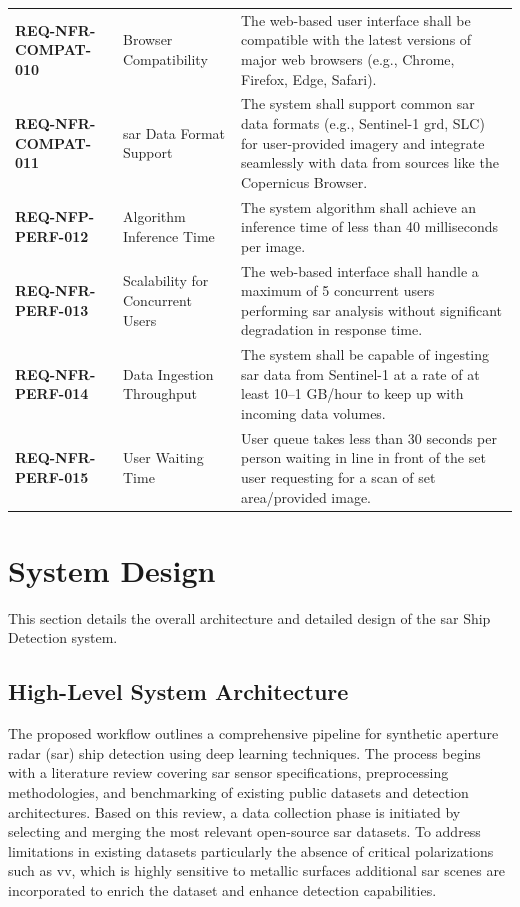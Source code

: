 \documentclass{article}
\begin{document}
\begin{longtable}{>{\bfseries}p{4.5cm}p{3.5cm}p{6.5cm}}
REQ-NFR-COMPAT-010 & Browser Compatibility & The web-based user interface shall be compatible with the latest versions of major web browsers (e.g., Chrome, Firefox, Edge, Safari). \\
REQ-NFR-COMPAT-011 & \acrshort{sar} Data Format Support & The system shall support common \acrshort{sar} data formats (e.g., Sentinel-1 \acrshort{grd}, SLC) for user-provided imagery and integrate seamlessly with data from sources like the Copernicus Browser. \\
REQ-NFP-PERF-012 & Algorithm Inference Time & The system algorithm shall achieve an inference time of less than 40 milliseconds per image. \\
REQ-NFR-PERF-013 & Scalability for Concurrent Users & The web-based interface shall handle a maximum of 5 concurrent users performing \acrshort{sar} analysis without significant degradation in response time. \\
REQ-NFR-PERF-014 & Data Ingestion Throughput & The system shall be capable of ingesting \acrshort{sar} data from Sentinel-1 at a rate of at least 10--1 GB/hour to keep up with incoming data volumes. \\
REQ-NFR-PERF-015 & User Waiting Time & User queue takes less than 30 seconds per person waiting in line in front of the set user requesting for a scan of set area/provided image. \\
\end{longtable}



\newpage
\section{System Design}
This section details the overall architecture and detailed design of the \acrshort{sar} Ship Detection system. \subsection{High-Level System Architecture}
The proposed workflow outlines a comprehensive pipeline for synthetic aperture radar (\acrshort{sar}) ship detection using deep learning techniques. The process begins with a literature review covering \acrshort{sar} sensor specifications, preprocessing methodologies, and benchmarking of existing public datasets and detection architectures. Based on this review, a data collection phase is initiated by selecting and merging the most relevant open-source \acrshort{sar} datasets. To address limitations in existing datasets particularly the absence of critical polarizations such as \acrshort{vv}, which is highly sensitive to metallic surfaces additional \acrshort{sar} scenes are incorporated to enrich the dataset and enhance detection capabilities. \\
\end{document}
